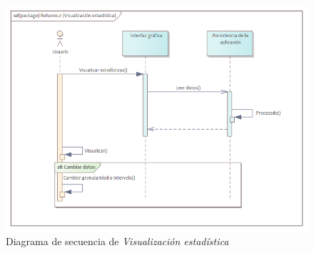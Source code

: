             \begin{figure}[h]
                \centering
                \includegraphics[width=1\textwidth]{figures/diseno/secuencia/Visualización estadística.png}
                \caption{Diagrama de secuencia de \textit{Visualización estadística}}
                \label{figure:diagrama_secuencia:visualizacion_estadistica}
            \end{figure}
            
